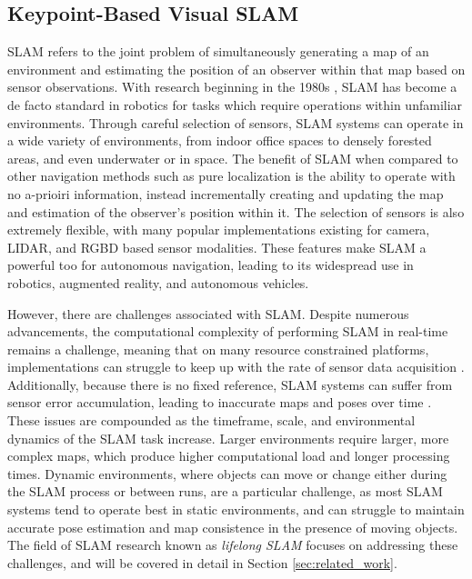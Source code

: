 \subsection{Keypoint-Based Visual SLAM}

SLAM refers to the joint problem of simultaneously generating a map of an environment and estimating the position of an observer within that map based on sensor observations. With research beginning in the 1980s \cite{smithEstimatingUncertainSpatial1988}, SLAM has become a de facto standard in robotics for tasks which require operations within unfamiliar environments. Through careful selection of sensors, SLAM systems can operate in a wide variety of environments, from indoor office spaces to densely forested areas, and even underwater or in space. The benefit of SLAM when compared to other navigation methods such as pure localization is the ability to operate with no a-prioiri information, instead incrementally creating and updating the map and  estimation of the observer's position within it. The selection of sensors is also extremely flexible, with many popular implementations existing for camera, LIDAR, and RGBD based sensor modalities. These features make SLAM a powerful too for autonomous navigation, leading to its widespread use in robotics, augmented reality, and autonomous vehicles.

However, there are challenges associated with SLAM. Despite numerous advancements, the computational complexity of performing SLAM in real-time remains a challenge, meaning that on many resource constrained platforms, implementations can struggle to keep up with the rate of sensor data acquisition \cite{semenovaQuantitativeAnalysisSystem2022}. Additionally, because there is no fixed reference, SLAM systems can suffer from sensor error accumulation, leading to inaccurate maps and poses over time \cite{cadenaPresentFutureSimultaneous2016}. These issues are compounded as the timeframe, scale, and environmental dynamics of the SLAM task increase. Larger environments require larger, more complex maps, which produce higher computational load and longer processing times. Dynamic environments, where objects can move or change either during the SLAM process or between runs, are a particular challenge, as most SLAM systems tend to operate best in static environments, and can struggle to maintain accurate pose estimation and map consistence in the presence of moving objects. The field of SLAM research known as \textit{lifelong SLAM} \cite{cadenaPresentFutureSimultaneous2016} focuses on addressing these challenges, and will be covered in detail in Section \ref{sec:related_work}.

